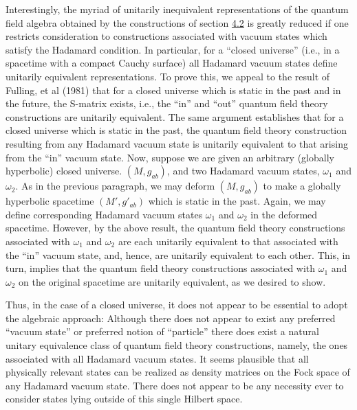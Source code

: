 \documentclass[11pt,a4paper]{article}
\begin{document}
Interestingly, the myriad of unitarily inequivalent representations of the quantum field algebra obtained by the constructions of section \hyperlink{sec:4.2}{4.2} is greatly reduced if one restricts consideration to constructions associated with vacuum states which satisfy the Hadamard condition. In particular, for a ``closed universe'' (i.e., in a spacetime with a compact Cauchy surface) all Hadamard vacuum states define unitarily equivalent representations. To prove this, we appeal to the result of Fulling, et al (1981) that for a closed universe which is static in the past and in the future, the S-matrix exists, i.e., the ``in'' and ``out'' quantum field theory constructions are unitarily equivalent. The same argument establishes that for a closed universe which is static in the past, the quantum field theory construction resulting from any Hadamard vacuum state is unitarily equivalent to that arising from the ``in'' vacuum state. Now, suppose we are given an arbitrary (globally hyperbolic) closed universe. \((M,g_{ab})\), and two Hadamard vacuum states, \(\omega_1\) and \(\omega_2\). As in the previous paragraph, we may deform \((M,g_{ab})\) to make a globally hyperbolic spacetime \((M',g'_{ab})\) which is static in the past. Again, we may define corresponding Hadamard vacuum states \(\omega_1\) and \(\omega_2\) in the deformed spacetime. However, by the above result, the quantum field theory constructions associated with \(\omega_1\) and \(\omega_2\) are each unitarily equivalent to that associated with the ``in'' vacuum state, and, hence, are unitarily equivalent to each other. This, in turn, implies that the quantum field theory constructions associated with \(\omega_1\) and \(\omega_2\) on the original spacetime are unitarily equivalent, as we desired to show.

Thus, in the case of a closed universe, it does not appear to be essential to adopt the algebraic approach: Although there does not appear to exist any preferred ``vacuum state'' or preferred notion of ``particle'' there does exist a natural unitary equivalence class of quantum field theory constructions, namely, the ones associated with all Hadamard vacuum states. It seems plausible that all physically relevant states can be realized as density matrices on the Fock space of any Hadamard vacuum state. There does not appear to be \hypertarget{source-110}{} any necessity ever to consider states lying outside of this single Hilbert space.
\end{document}
